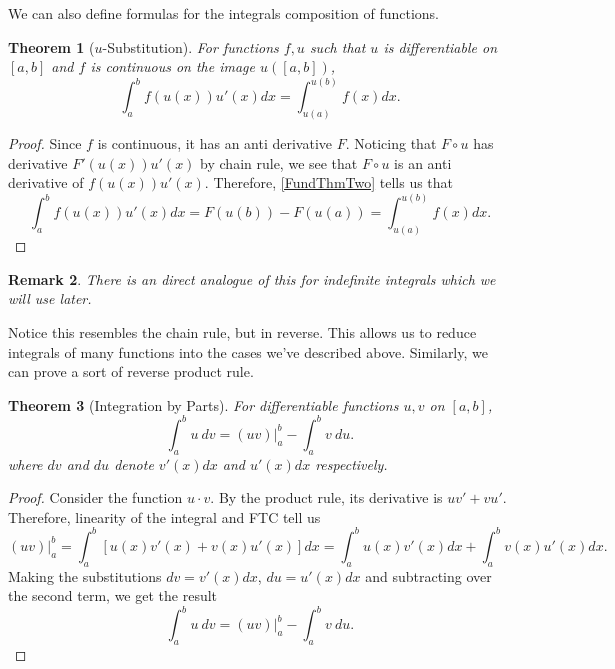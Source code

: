 \documentclass[12pt]{article}
\newcommand{\eval}[1]{ \left. #1 \right| }
\newtheorem{thm}{Theorem}[section]
\theoremstyle{definition}
\theoremstyle{plain}
\newtheorem{rem}[thm]{Remark}
\numberwithin{equation}{section}
\begin{document}

We can also define formulas for the integrals composition of functions.

\begin{thm}[$u$-Substitution]\label{USub}
  For functions $f,u$ such that $u$ is differentiable on $[a,b]$ and $f$ is continuous on the image $u([a,b])$,
  \begin{equation}
    \int_{a}^{b}f(u(x))u'(x)dx=\int_{u(a)}^{u(b)}f(x)dx.
  \end{equation}
\end{thm}

\begin{proof}
  Since $f$ is continuous, it has an anti derivative $F$. Noticing that $F\circ u$ has derivative $F'(u(x))u'(x)$ by chain rule, we see that $F\circ u$ is an anti derivative of $f(u(x))u'(x)$. Therefore, \cref{FundThmTwo} tells us that
  \begin{equation}
      \int_{a}^{b}f(u(x))u'(x)dx=F(u(b))-F(u(a))=\int_{u(a)}^{u(b)}f(x)dx.
  \end{equation}
\end{proof}
\begin{rem}
  There is an direct analogue of this for indefinite integrals which we will use later.
\end{rem}

Notice this resembles the chain rule, but in reverse. This allows us to reduce integrals of many functions into the cases we've described above. Similarly, we can prove a sort of reverse product rule.




\begin{thm}[Integration by Parts]\label{IBP}
For differentiable functions $u,v$ on $[a,b]$,
\begin{equation}
  \int_{a}^{b}u\ dv=\eval{(uv)}^{b}_{a}-\int_{a}^{b}v\ du.
\end{equation}
where $dv$ and $du$ denote $v'(x)dx$ and $u'(x)dx$ respectively.
\end{thm}
\begin{proof}
  Consider the function $u\cdot v$. By the product rule, its derivative is $uv'+vu'$. Therefore, linearity of the integral and FTC tell us
  \begin{equation}
  \eval{(uv)}^{b}_{a}= \int_{a}^{b}[u(x)v'(x)+v(x)u'(x)]dx=\int_{a}^{b}u(x)v'(x)dx + \int_{a}^{b}v(x)u'(x)dx.
\end{equation}
Making the substitutions $dv=v'(x)dx$, $du=u'(x)dx$ and subtracting over the second term, we get the result
\begin{equation*}
  \int_{a}^{b}u\ dv=\eval{(uv)}^{b}_{a}-\int_{a}^{b}v\ du.
\end{equation*}
\end{proof}
\end{document}
